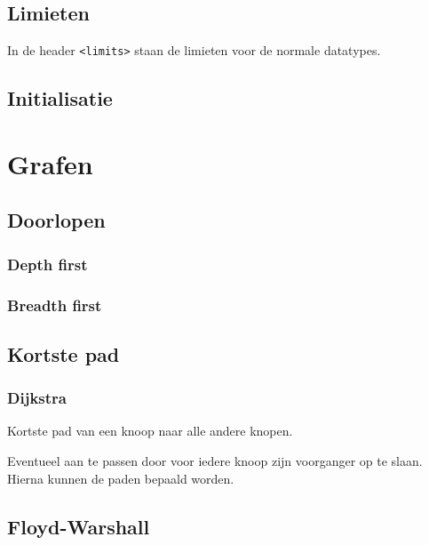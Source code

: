 \documentclass[10pt,hidelinks]{article}
\begin{document}
\subsection{Limieten}
In de header \texttt{<limits>} staan de limieten voor de normale datatypes.


\subsection{Initialisatie}



\pagebreak

\section{Grafen}

\subsection{Doorlopen}

\subsubsection{Depth first}



\subsubsection{Breadth first}



\subsection{Kortste pad}

\subsubsection{Dijkstra}

Kortste pad van een knoop naar alle andere knopen.



Eventueel aan te passen door voor iedere knoop zijn voorganger op te slaan. Hierna kunnen de paden bepaald worden.

\subsection{Floyd-Warshall}
\end{document}
